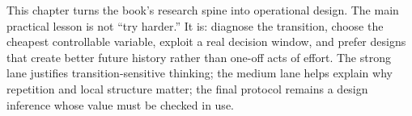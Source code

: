 \begin{summarybox}
This chapter turns the book's research spine into operational design. The main
practical lesson is not ``try harder.'' It is: diagnose the transition, choose
the cheapest controllable variable, exploit a real decision window, and prefer
designs that create better future history rather than one-off acts of effort.
The strong lane justifies transition-sensitive thinking; the medium lane helps
explain why repetition and local structure matter; the final protocol remains a
design inference whose value must be checked in use.
\end{summarybox}
